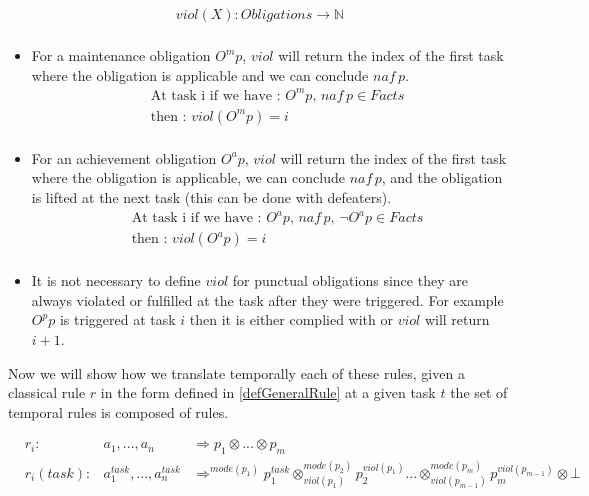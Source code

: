 \documentclass[10pt]{report}
\begin{document}
\begin{equation}\label{defViol}
\begin{split} 
viol(X) : Obligations \rightarrow \mathbb{N}\\
\end{split}
\end{equation}

\begin{itemize}

\item For a maintenance obligation $O^{m}p$, $viol$ will return the index of the first task where the obligation is applicable and we can conclude $naf\,p$. 
\begin{equation} 
\begin{aligned}
& \text{At task i if we have : } O^{m}p \text{, } naf\,p \in Facts\\
& \text{then : } viol(O^{m}p) = i\\
\end{aligned}
\end{equation}

\item For an achievement obligation $O^{a}p$, $viol$ will return the index of the first task where the obligation is applicable, we can conclude $naf\,p$, and the obligation is lifted at the next task (this can be done with defeaters).
\begin{equation} 
\begin{aligned}
& \text{At task i if we have : } O^{a}p \text{, } naf\,p \text{, } \neg O^{a}p \in Facts\\
& \text{then : } viol(O^{a}p) = i\\
\end{aligned}
\end{equation}

\item It is not necessary to define $viol$ for punctual obligations since they are always violated or fulfilled at the task after they were triggered. For example $O^{p}p$ is triggered at task $i$ then it is either complied with or $viol$ will return $i+1$.
\end{itemize}


Now we will show how we translate temporally each of these rules, given a classical rule $r$ in the form defined in \ref{defGeneralRule} at a given task $t$ the set of temporal rules is composed of rules.

\begin{equation} \label{ruleClassicToTemp}
\begin{aligned}
&r_{i} :& a_{1}, ..., a_{n} &\Rightarrow p_{1} \otimes ... \otimes p_{m} \\
&r_{i} (task) :& a_{1}^{task}, ..., a_{n}^{task}  &\Rightarrow^{mode(p_{1})} p_{1}^{task} \otimes^{mode(p_{2})}_{viol(p_{1})} p_{2}^{viol(p_{1})}  ...      \otimes^{mode(p_{m})}_{viol(p_{m-1})} p_{m}^{viol(p_{m-1})} \otimes \bot
\end{aligned}
\end{equation}
\end{document}
